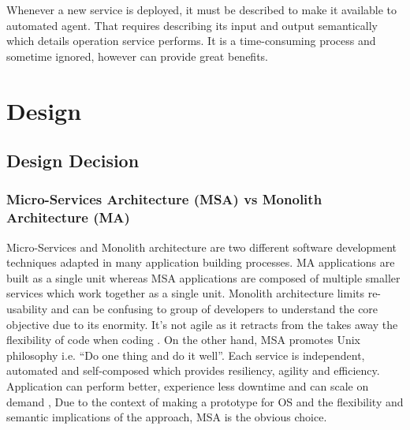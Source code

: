 Whenever a new service is deployed, it must be described to make it available to automated agent. That requires describing its input and output semantically which details operation service performs. It is a time-consuming process and sometime ignored, however can provide great benefits. 
\section{Design}
\subsection{Design Decision}
\subsubsection{Micro-Services Architecture (MSA) vs Monolith Architecture (MA)}
Micro-Services and Monolith architecture are two different software development techniques adapted in many application building processes. MA applications are built as a single unit whereas MSA applications are composed of multiple smaller services which work together as a single unit.
Monolith architecture limits re-usability and can be confusing to group of developers to understand the core objective due to its enormity. It's not agile as it retracts from the takes away the flexibility of code when coding \citep{mulesoft_2016}.
On the other hand, MSA promotes Unix philosophy i.e. ``Do one thing and do it well''. Each service is independent, automated and self-composed which provides resiliency, agility and efficiency. Application can perform better, experience less downtime and can scale on demand \citep{mulesoft_2016}, Due to the context of making a prototype for OS and the flexibility and semantic implications of the approach, MSA is the obvious choice.
